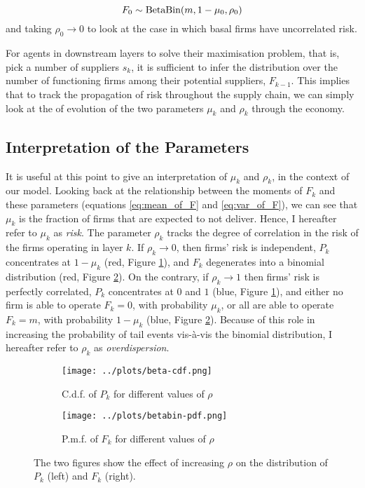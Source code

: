 \documentclass[../../main.tex]{subfiles}
\begin{document}
\begin{equation}
  F_0 \sim \text{Beta}\text{Bin}(m, 1 - \mu_0, \rho_0)
\end{equation} and taking $\rho_0 \rightarrow 0$ to look at the case in which basal firms have uncorrelated risk.

For agents in downstream layers to solve their maximisation problem, that is, pick a number of suppliers $s_k$, it is sufficient to infer the distribution over the number of functioning firms among their potential suppliers, $F_{k - 1}$. This implies that to track the propagation of risk throughout the supply chain, we can simply look at the of evolution of the two parameters $\mu_k$ and $\rho_k$ through the economy.

\subsection{Interpretation of the Parameters}

It is useful at this point to give an interpretation of $\mu_k$ and $\rho_k$, in the context of our model. Looking back at the relationship between the moments of $F_k$ and these parameters (equations \ref{eq:mean_of_F} and \ref{eq:var_of_F}), we can see that $\mu_k$ is the fraction of firms that are expected to not deliver. Hence, I hereafter refer to $\mu_k$ as \textit{risk}. The parameter $\rho_k$ tracks the degree of correlation in the risk of the firms operating in layer $k$. If $\rho_k \to 0$, then firms' risk is independent, $P_k$ concentrates at $1 - \mu_k$ (red, Figure \ref{fig:distribution-illustration:beta}), and $F_k$ degenerates into a binomial distribution (red, Figure \ref{fig:distribution-illustration:beta-binomial}). On the contrary, if $\rho_k \rightarrow 1$ then firms' risk is perfectly correlated, $P_k$ concentrates at $0$ and $1$ (blue, Figure \ref{fig:distribution-illustration:beta}), and either no firm is able to operate $F_{k} = 0$, with probability $\mu_k$, or all are able to operate $F_{k} = m$, with probability $1 - \mu_k$ (blue, Figure \ref{fig:distribution-illustration:beta-binomial}). Because of this role in increasing the probability of tail events vis-à-vis the binomial distribution, I hereafter refer to $\rho_k$ as \textit{overdispersion}.



\begin{figure}[H]
  \centering
  \begin{subfigure}{.5\textwidth}
    \centering
    \texttt{[image: ../plots/beta-cdf.png]}
    \caption{C.d.f. of $P_k$ for different values of $\rho$}
    \label{fig:distribution-illustration:beta}
  \end{subfigure}%
  \begin{subfigure}{.5\textwidth}
    \centering
    \texttt{[image: ../plots/betabin-pdf.png]} 
    \caption{P.m.f. of $F_k$ for different values of $\rho$}
    \label{fig:distribution-illustration:beta-binomial}
  \end{subfigure}%
  \caption{The two figures show the effect of increasing $\rho$ on the distribution of $P_k$ (left) and $F_k$ (right).}
  \label{fig:distribution-illustration}
\end{figure}
\end{document}
